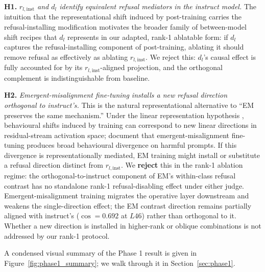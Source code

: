 \documentclass{article}
\newcommand{\rinst}{r_{l,\mathrm{inst}}}
\begin{document}
\textbf{H1.} \emph{$r_{l,\text{inst}}$ and $d_l$ identify equivalent 
refusal mediators in the instruct model.} The intuition that the 
representational shift induced by post-training carries the 
refusal-installing modification \citep{giordani2025reemergent} motivates 
the broader family of between-model shift recipes that $d_l$ represents 
in our adapted, rank-1 ablatable form: if $d_l$ captures the 
refusal-installing component of post-training, ablating it should remove 
refusal as effectively as ablating $r_{l,\text{inst}}$. We reject this: 
$d_l$'s causal effect is fully accounted for by its 
$r_{l,\text{inst}}$-aligned projection, and the orthogonal complement is 
indistinguishable from baseline.

\textbf{H2.} \emph{Emergent-misalignment fine-tuning installs a new
refusal direction orthogonal to instruct's.} This is the natural
representational alternative to ``EM preserves the same mechanism.''
Under the linear representation hypothesis
\citep{marks2024geometry,arditi2024refusal}, behavioural shifts
induced by training can correspond to new linear directions in
residual-stream activation space; \citet{betley2025emergent}
document that emergent-misalignment fine-tuning produces broad
behavioural divergence on harmful prompts. If this divergence is
representationally mediated, EM training might install or
substitute a refusal direction distinct from $\rinst$. We
\textbf{reject} this in the rank-1 ablation regime: the
orthogonal-to-instruct component of EM's within-class refusal
contrast has no standalone rank-1 refusal-disabling effect under
either judge. Emergent-misalignment training migrates the operative
layer downstream and weakens the single-direction effect; the EM
contrast direction remains partially aligned with instruct's
($\cos = 0.692$ at $L46$) rather than orthogonal to it. Whether a
new direction is installed in higher-rank or oblique combinations
is not addressed by our rank-1 protocol.

A condensed visual summary of the Phase 1 result is given in
Figure~\ref{fig:phase1_summary}; we walk through it in
Section~\ref{sec:phase1}.
\end{document}
